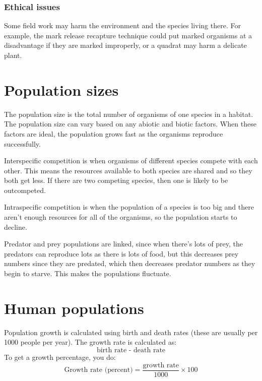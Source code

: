 \documentclass{article}
\begin{document}
\subsubsection*{Ethical issues}
Some field work may harm the environment and the species living there. For example, the mark release recapture technique could put marked organisms at a disadvantage if they are marked improperly, or a quadrat may harm a delicate plant.

\section*{Population sizes}
The population size is the total number of organisms of one species in a habitat. The population size can vary based on any abiotic and biotic factors. When these factors are ideal, the population grows fast as the organisms reproduce successfully.

Interspecific competition is when organisms of different species compete with each other. This means the resources available to both species are shared and so they both get less. If there are two competing species, then one is likely to be outcompeted.

Intraspecific competition is when the population of a species is too big and there aren't enough resources for all of the organisms, so the population starts to decline.

Predator and prey populations are linked, since when there's lots of prey, the predators can reproduce lots as there is lots of food, but this decreases prey numbers since they are predated, which then decreases predator numbers as they begin to starve. This makes the populations fluctuate.

\section*{Human populations}
Population growth is calculated using birth and death rates (these are usually per 1000 people per year). The growth rate is calculated as:
\[
		\textrm{birth rate - death rate}
\]
To get a growth percentage, you do:
\[
	\textrm{Growth rate (percent)} = \frac{\textrm{growth rate}}{1000} \times 100
\]
\end{document}
